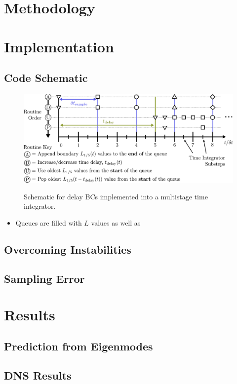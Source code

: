 \section{Methodology}

\section{Implementation}


\subsection{Code Schematic}

\begin{figure}[h]
\centering
\includegraphics[scale=0.6]{assets/imgs/delay_bc_code_schematic.pdf}
\label{fig:schematic}
\caption{Schematic for delay BCs implemented into a multistage time integrator. }
\end{figure}


\begin{itemize}
\item Queues are filled with $L$ values as well as 
\end{itemize}



\subsection{Overcoming Instabilities}



\subsection{Sampling Error}



\section{Results}

\subsection{Prediction from Eigenmodes}

\subsection{DNS Results}




